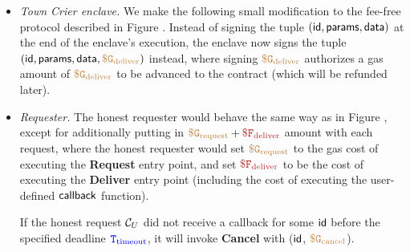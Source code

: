 \begin{itemize}[leftmargin=5mm]
\item
{\it Town Crier enclave.}
We make the following small modification to the fee-free protocol
described in Figure .
Instead of signing the tuple $({\sf id}, {\sf params}, {\sf data})$
at the end of the enclave's execution, the enclave now signs 
the tuple $({\sf id}, {\sf params}, {\sf data}, 
\tt {\color{brown} \$ G_{\text{deliver}} })$
instead, where signing 
$\tt {\color{brown} \$ G_{\text{deliver}} }$ authorizes a
gas amount of $\tt {\color{brown} \$ G_{\text{deliver}} }$ to be advanced
to the contract (which will be refunded later).
\item
{\it Requester.}
The honest requester would behave the same way as in Figure ,
except for additionally putting 
in $\sbrown{\$ G_{\text{request}}} + \smaroon{\$ F_{\text{deliver}}}$ 
amount with each request, 
where the honest 
requester would set  
$\tt {\color{brown} \$ G_{\text{request}} }$
to the gas cost of executing the  
{\bf Request} entry point,
and set $\smaroon{\$ F_{\text{deliver}}}$ to be the cost 
of executing the {\bf Deliver} entry point (including
the cost of executing the user-defined ${\sf callback}$ function).

If the honest request ${\cal C}_U$ did not receive
a callback for some ${\sf id}$  
before the specified deadline ${\color{blue} {{\tt T}}_{\text{timeout}}}$,
it will invoke  
{\bf Cancel}
with (${\sf id}$, $\tt {\color{brown} \$ G_{\text{cancel}} }$).
\end{itemize}


